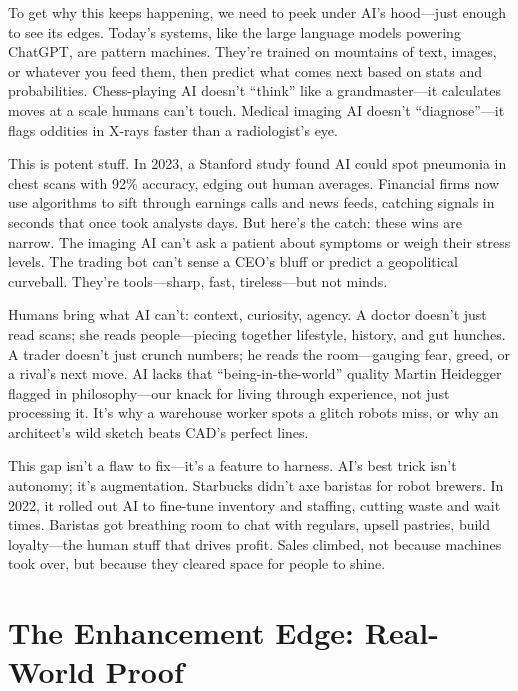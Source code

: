 \documentclass[
  Letterpaper,
]{scrbook}
\begin{document}
To get why this keeps happening, we need to peek under AI's hood---just
enough to see its edges. Today's systems, like the large language
models powering ChatGPT, are
pattern machines. They're trained on mountains of text, images, or
whatever you feed them, then predict what comes next based on stats and
probabilities. Chess-playing AI doesn't ``think'' like a
grandmaster---it calculates moves at a scale humans can't touch. Medical
imaging AI doesn't ``diagnose''---it flags oddities in X-rays faster
than a radiologist's eye.

This is potent stuff. In 2023, a Stanford study found AI could spot
pneumonia in chest scans with 92\% accuracy, edging out human averages.
Financial firms now use algorithms to sift through earnings calls and
news feeds, catching signals in seconds that once took analysts days.
But here's the catch: these wins are narrow. The imaging AI can't ask a
patient about symptoms or weigh their stress levels. The trading bot
can't sense a CEO's bluff or predict a geopolitical curveball. They're
tools---sharp, fast, tireless---but not minds.

Humans bring what AI can't: context, curiosity, agency. A doctor doesn't
just read scans; she reads people---piecing together lifestyle, history,
and gut hunches. A trader doesn't just crunch numbers; he reads the
room---gauging fear, greed, or a rival's next move. AI lacks that
``being-in-the-world''
quality Martin Heidegger flagged in
philosophy---our knack for living through experience, not just
processing it. It's why a warehouse worker spots a glitch robots miss,
or why an architect's wild sketch beats CAD's perfect lines.

This gap isn't a flaw to fix---it's a feature to harness. AI's best
trick isn't autonomy; it's
augmentation.
Starbucks didn't axe baristas for robot
brewers. In 2022, it rolled out AI to fine-tune inventory and staffing,
cutting waste and wait times. Baristas got breathing room to chat with
regulars, upsell pastries, build loyalty---the human stuff that drives
profit. Sales climbed, not because machines took over, but because they
cleared space for people to shine.

\section{The Enhancement Edge: Real-World
Proof}\label{the-enhancement-edge-real-world-proof}
\end{document}
